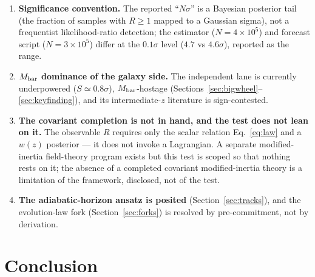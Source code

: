 \documentclass[11pt,a4paper]{article}
\newcommand{\Mbar}{M_{\rm bar}}
\begin{document}
\begin{enumerate}
\item \textbf{Significance convention.} The reported ``$N\sigma$'' is a
Bayesian posterior tail (the fraction of samples with $R\ge1$ mapped to a
Gaussian sigma), not a frequentist likelihood-ratio detection; the estimator
($N=4\times10^5$) and forecast script ($N=3\times10^5$) differ at the
$0.1\sigma$ level ($4.7$ vs $4.6\sigma$), reported as the range.
\item \textbf{$\Mbar$ dominance of the galaxy side.} The independent lane is
currently underpowered ($S\simeq0.8\sigma$), $\Mbar$-hostage
(Sections~\ref{sec:bigwheel}--\ref{sec:keyfinding}), and its intermediate-$z$
literature is sign-contested.
\item \textbf{The covariant completion is not in hand, and the test does not
lean on it.} The observable $R$ requires only the scalar relation
Eq.~\eqref{eq:law} and a $w(z)$ posterior --- it does not invoke a Lagrangian.
A separate modified-inertia field-theory program exists \cite{Zmift} but this
test is scoped so that nothing rests on it; the absence of a completed
covariant modified-inertia theory is a limitation of the framework, disclosed,
not of the test.
\item \textbf{The adiabatic-horizon ansatz is posited}
(Section~\ref{sec:tracks}), and the evolution-law fork
(Section~\ref{sec:forks}) is resolved by pre-commitment, not by derivation.
\end{enumerate}

\section{Conclusion}
\end{document}
